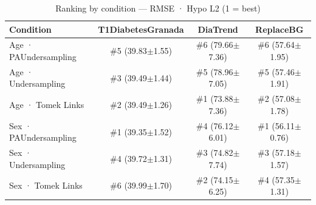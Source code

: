 \begin{table}[htbp]
\centering
\small
\caption{Ranking by condition — RMSE · Hypo L2  (1 = best)}
\label{tab:ranking_rmse_tbr_2_family_size_undersampling}
\begin{tabular}{lccc}
\toprule
\textbf{Condition} & \textbf{T1DiabetesGranada} & \textbf{DiaTrend} & \textbf{ReplaceBG} \\
\midrule
Age · PAUndersampling & \#5 (39.83$\pm$1.55) & \#6 (79.66$\pm$7.36) & \#6 (57.64$\pm$1.95) \\
Age · Undersampling & \#3 (39.49$\pm$1.44) & \#5 (78.96$\pm$7.05) & \#5 (57.46$\pm$1.91) \\
Age · Tomek Links & \#2 (39.49$\pm$1.26) & \#1 (73.88$\pm$7.36) & \#2 (57.08$\pm$1.78) \\
\midrule
Sex · PAUndersampling & \#1 (39.35$\pm$1.52) & \#4 (76.12$\pm$6.01) & \#1 (56.11$\pm$0.76) \\
Sex · Undersampling & \#4 (39.72$\pm$1.31) & \#3 (74.82$\pm$7.74) & \#3 (57.18$\pm$1.57) \\
Sex · Tomek Links & \#6 (39.99$\pm$1.70) & \#2 (74.15$\pm$6.25) & \#4 (57.35$\pm$1.31) \\
\bottomrule
\end{tabular}
\end{table}